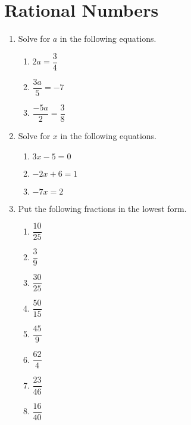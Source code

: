 \documentclass{report}
\begin{document}
\section{Rational Numbers}
\begin{enumerate}
	\item Solve for $a$ in the following equations.
		\begin{enumerate}
			\item $2a = \dfrac{3}{4}$
			\item $\dfrac{3a}{5} = -7$
			\item $\dfrac{-5a}{2} = \dfrac{3}{8}$
		\end{enumerate}
	\item Solve for $x$ in the following equations.
		\begin{enumerate}
			\item $3x - 5 = 0$
			\item $-2x + 6 = 1$
			\item $-7x = 2$
		\end{enumerate}
	\item Put the following fractions in the lowest form.
		\begin{enumerate}
			\item $ \dfrac{10}{25} $
			\item $\dfrac{3}{9}$
			\item $\dfrac{30}{25}$
			\item $\dfrac{50}{15}$
			\item $\dfrac{45}{9}$
			\item $\dfrac{62}{4}$
			\item $\dfrac{23}{46}$
			\item $\dfrac{16}{40}$
		\end{enumerate}
\end{enumerate}
\end{document}
